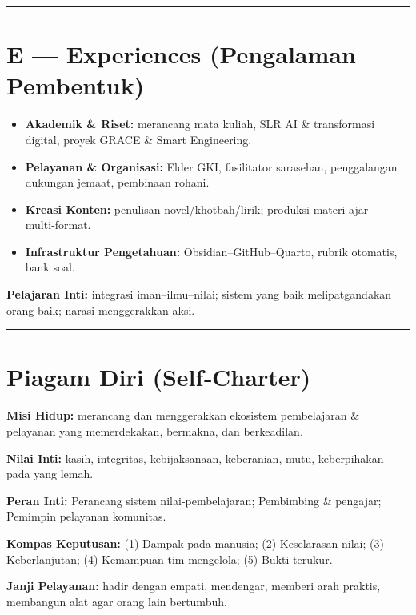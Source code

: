 \documentclass[
  letterpaper,
  DIV=11,
  numbers=noendperiod]{scrreprt}
\providecommand{\tightlist}{%
  \setlength{\itemsep}{0pt}\setlength{\parskip}{0pt}}
\begin{document}
\begin{center}\rule{0.5\linewidth}{0.5pt}\end{center}

\section{E --- Experiences (Pengalaman
Pembentuk)}\label{e-experiences-pengalaman-pembentuk}

\begin{itemize}
\tightlist
\item
  \textbf{Akademik \& Riset:} merancang mata kuliah, SLR AI \&
  transformasi digital, proyek GRACE \& Smart Engineering.
\item
  \textbf{Pelayanan \& Organisasi:} Elder GKI, fasilitator sarasehan,
  penggalangan dukungan jemaat, pembinaan rohani.
\item
  \textbf{Kreasi Konten:} penulisan novel/khotbah/lirik; produksi materi
  ajar multi‑format.
\item
  \textbf{Infrastruktur Pengetahuan:} Obsidian--GitHub--Quarto, rubrik
  otomatis, bank soal.
\end{itemize}

\textbf{Pelajaran Inti:} integrasi iman--ilmu--nilai; sistem yang baik
melipatgandakan orang baik; narasi menggerakkan aksi.

\begin{center}\rule{0.5\linewidth}{0.5pt}\end{center}

\section{Piagam Diri (Self‑Charter)}\label{piagam-diri-selfcharter}

\textbf{Misi Hidup:} merancang dan menggerakkan ekosistem pembelajaran
\& pelayanan yang memerdekakan, bermakna, dan berkeadilan.

\textbf{Nilai Inti:} kasih, integritas, kebijaksanaan, keberanian, mutu,
keberpihakan pada yang lemah.

\textbf{Peran Inti:} Perancang sistem nilai‑pembelajaran; Pembimbing \&
pengajar; Pemimpin pelayanan komunitas.

\textbf{Kompas Keputusan:} (1) Dampak pada manusia; (2) Keselarasan
nilai; (3) Keberlanjutan; (4) Kemampuan tim mengelola; (5) Bukti
terukur.

\textbf{Janji Pelayanan:} hadir dengan empati, mendengar, memberi arah
praktis, membangun alat agar orang lain bertumbuh.
\end{document}
